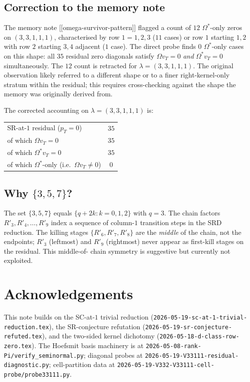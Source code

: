 \documentclass[11pt]{article}
\theoremstyle{definition}
\newcommand{\la}{\lambda}
\newcommand{\Om}{\Omega}
\begin{document}
\subsection{Correction to the memory note}
The memory note [[omega-survivor-pattern]] flagged a count of $12$
$\Om^*$-only zeros on $(3,3,1,1,1)$, characterised by row $1 = 1,2,3$
($11$ cases) or row $1$ starting $1, 2$ with row $2$ starting $3, 4$
adjacent ($1$ case). The direct probe finds $0$ $\Om^*$-only cases on
this shape: all $35$ residual zero diagonals satisfy $\Om v_T = 0$
\emph{and} $\Om^* v_T = 0$ simultaneously. The $12$ count is
retracted for $\la = (3,3,1,1,1)$. The original observation likely
referred to a different shape or to a finer right-kernel-only
stratum within the residual; this requires cross-checking against
the shape the memory was originally derived from.

The corrected accounting on $\la = (3,3,1,1,1)$ is:
\begin{center}
\begin{tabular}{l|c}
SR-at-$1$ residual ($p_T = 0$) & $35$ \\
of which $\Om v_T = 0$ & $35$ \\
of which $\Om^* v_T = 0$ & $35$ \\
of which $\Om^*$-only (i.e.\ $\Om v_T \ne 0$) & $0$ \\
\end{tabular}
\end{center}

\subsection{Why $\{3, 5, 7\}$?}
The set $\{3, 5, 7\}$ equals $\{q + 2k : k = 0, 1, 2\}$ with
$q = 3$. The chain factors $R'_3, R'_4, \ldots, R'_9$ index a
sequence of column-$1$ transition steps in the SRD reduction. The
killing stages $\{R'_6, R'_7, R'_8\}$ are the \emph{middle} of the
chain, not the endpoints; $R'_3$ (leftmost) and $R'_9$ (rightmost)
never appear as first-kill stages on the residual. This middle-of-
chain symmetry is suggestive but currently not exploited.

\section*{Acknowledgements}

This note builds on the SC-at-$1$ trivial reduction
(\texttt{2026-05-19-sc-at-1-trivial-reduction.tex}), the SR-conjecture
refutation (\texttt{2026-05-19-sr-conjecture-refuted.tex}), and the
two-sided kernel dichotomy
(\texttt{2026-05-18-d-class-row-zero.tex}). The Hoefsmit basis
machinery is at \texttt{2026-05-08-rank-Pi/verify\_seminormal.py};
diagonal probes at \texttt{2026-05-19-V33111-residual-diagnostic.py};
cell-partition data at
\texttt{2026-05-19-V332-V33111-cell-probe/probe33111.py}.
\end{document}
